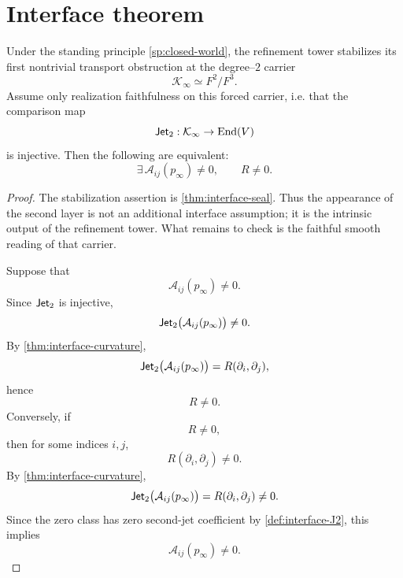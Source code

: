 \section{Interface theorem}
\label{sec:interface-main}
\begin{theorem}
	\label{thm:interface-main}
	Under the standing principle \cref{sp:closed-world}, the refinement
	tower stabilizes its first nontrivial transport obstruction at the
	degree--\(2\) carrier
	\[
		\mathcal K_\infty\simeq F^2/F^3.
	\]
	Assume only realization faithfulness on this forced carrier, i.e. that
	the comparison map
	\[
		\mathsf{Jet}_2:\mathcal K_\infty\to \mathrm{End}(V)
	\]
	is injective.
	Then the following are equivalent:
	\[
		\exists\,\mathcal A_{ij}(p_\infty)\neq0,
		\qquad
		R\neq0.
	\]
\end{theorem}
\begin{proof}
	The stabilization assertion is \cref{thm:interface-seal}.  Thus the
	appearance of the second layer is not an additional interface assumption;
	it is the intrinsic output of the refinement tower.  What remains to
	check is the faithful smooth reading of that carrier.

	Suppose that
	\[
		\mathcal A_{ij}(p_\infty)\neq 0.
	\]
	Since \(\mathsf{Jet}_2\) is injective,
	\[
		\mathsf{Jet}_2\bigl(\mathcal A_{ij}(p_\infty)\bigr)\neq 0.
	\]
	By \cref{thm:interface-curvature},
	\[
		\mathsf{Jet}_2\bigl(\mathcal A_{ij}(p_\infty)\bigr)
		=
		R(\partial_i,\partial_j),
	\]
	hence
	\[
		R\neq 0.
	\]
	Conversely, if
	\[
		R\neq 0,
	\]
	then for some indices \(i,j\),
	\[
		R(\partial_i,\partial_j)\neq 0.
	\]
	By \cref{thm:interface-curvature},
	\[
		\mathsf{Jet}_2\bigl(\mathcal A_{ij}(p_\infty)\bigr)=R(\partial_i,\partial_j)\neq 0.
	\]
	Since the zero class has zero second-jet coefficient by
	\cref{def:interface-J2}, this implies
	\[
		\mathcal A_{ij}(p_\infty)\neq 0.
	\]
\end{proof}
